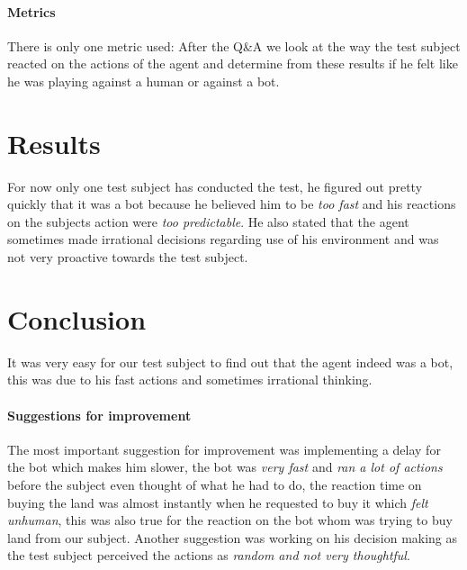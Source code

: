 \paragraph{Metrics}

There is only one metric used: After the Q\&A we look at the way the test subject reacted on the actions of the agent and determine from these results if he felt like he was playing against a human or against a bot. 

\section*{Results}

For now only one test subject has conducted the test, he figured out pretty quickly that it was a bot because he believed him to be \textit{too fast} and his reactions on the subjects action were \textit{too predictable}. He also stated that the agent sometimes made irrational decisions regarding use of his environment and was not very proactive towards the test subject.

\section*{Conclusion}

It was very easy for our test subject to find out that the agent indeed was a bot, this was due to his fast actions and sometimes irrational thinking.

\paragraph{Suggestions for improvement}

The most important suggestion for improvement was implementing a delay for the bot which makes him slower, the bot was \textit{very fast} and \textit{ran a lot of actions} before the subject even thought of what he had to do, the reaction time on buying the land was almost instantly when he requested to buy it which \textit{felt unhuman}, this was also true for the reaction on the bot whom was trying to buy land from our subject. Another suggestion was working on his decision making as the test subject perceived the actions as \textit{random and not very thoughtful}.


